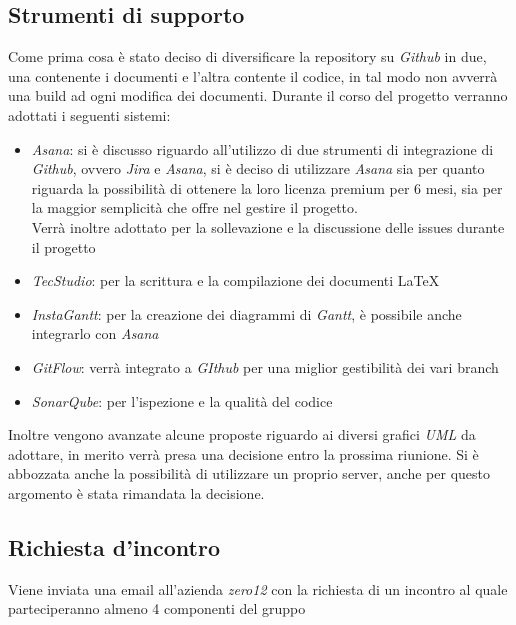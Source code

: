 \documentclass[a4paper,12pt]{article}
\begin{document}
	\subsection{Strumenti di supporto}
	Come prima cosa è stato deciso di diversificare la repository su \textit{Github} in due, una contenente i documenti e l'altra contente il codice, in tal modo non avverrà una build ad ogni modifica dei documenti.
	Durante il corso del progetto verranno adottati i seguenti sistemi:
	\begin{itemize}
		\item\textit{Asana}: si è discusso riguardo all'utilizzo di due strumenti di integrazione di \textit{Github}, ovvero \textit{Jira} e \textit{Asana}, si è deciso di utilizzare \textit{Asana} sia per quanto riguarda la possibilità di ottenere la loro licenza premium per 6 mesi, sia per la maggior semplicità che offre nel gestire il progetto. \\
		Verrà inoltre adottato per la sollevazione e la discussione delle issues durante il progetto
		\item \textit{TecStudio}: per la scrittura e la compilazione dei documenti \LaTeX 
		\item \textit{InstaGantt}: per la creazione dei diagrammi di \textit{Gantt}, è possibile anche integrarlo con \textit{Asana}
		\item \textit{GitFlow}: verrà integrato a \textit{GIthub} per una miglior gestibilità dei vari branch
		\item \textit{SonarQube}: per l'ispezione e la qualità del codice		
	\end{itemize}	
	Inoltre vengono avanzate alcune proposte riguardo ai diversi grafici \textit{UML} da adottare, in merito verrà presa una decisione entro la prossima riunione. Si è abbozzata anche la possibilità di utilizzare un proprio server, anche per questo argomento è stata rimandata la decisione.
	\subsection{Richiesta d'incontro}
	Viene inviata una email all'azienda \textit{zero12} con la richiesta di un incontro al quale parteciperanno almeno 4 componenti del gruppo
\end{document}
